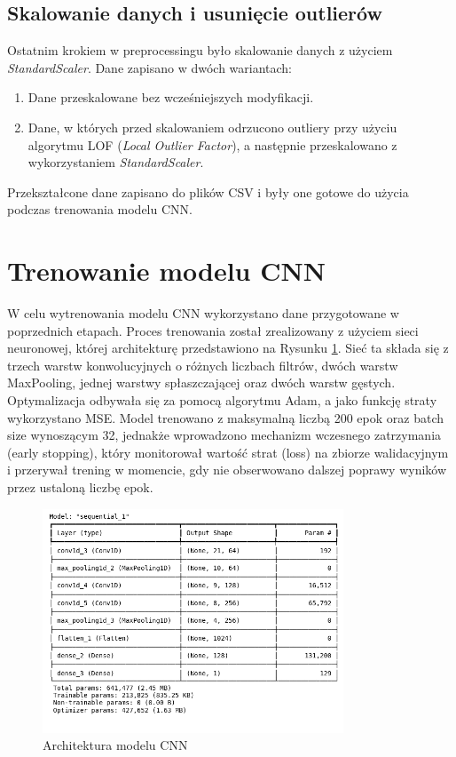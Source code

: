 \documentclass[12pt]{article}
\begin{document}
\subsection{Skalowanie danych i usunięcie outlierów}

Ostatnim krokiem w preprocessingu było skalowanie danych z użyciem \emph{StandardScaler}. Dane zapisano w dwóch wariantach:
\begin{enumerate}
    \item Dane przeskalowane bez wcześniejszych modyfikacji.
    \item Dane, w których przed skalowaniem odrzucono outliery przy użyciu algorytmu LOF (\emph{Local Outlier Factor}), a następnie przeskalowano z wykorzystaniem \emph{StandardScaler}.
\end{enumerate}

Przekształcone dane zapisano do plików CSV i były one gotowe do użycia podczas trenowania modelu CNN.


\newpage \section{Trenowanie modelu CNN}

W celu wytrenowania modelu CNN wykorzystano dane przygotowane w poprzednich etapach. Proces trenowania został zrealizowany z użyciem sieci neuronowej, której architekturę przedstawiono na Rysunku \ref{fig
}. Sieć ta składa się z trzech warstw konwolucyjnych o różnych liczbach filtrów, dwóch warstw MaxPooling, jednej warstwy spłaszczającej oraz dwóch warstw gęstych. Optymalizacja odbywała się za pomocą algorytmu Adam, a jako funkcję straty wykorzystano MSE. Model trenowano z maksymalną liczbą 200 epok oraz batch size wynoszącym 32, jednakże wprowadzono mechanizm wczesnego zatrzymania (early stopping), który monitorował wartość strat (loss) na zbiorze walidacyjnym i przerywał trening w momencie, gdy nie obserwowano dalszej poprawy wyników przez ustaloną liczbę epok.

\begin{figure}[h] \centering \includegraphics[width=0.8\textwidth]{docs/img/model-architecture.png} \caption{Architektura modelu CNN} \label{fig
} \end{figure}
\end{document}
